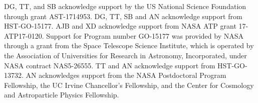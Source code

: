 DG, TT, and SB acknowledge support by the US National Science Foundation through grant AST-1714953. DG, TT, SB and AN acknowledge support from HST-GO-15177. AJB and XD acknowledge support from NASA ATP grant 17-ATP17-0120. Support for Program number GO-15177 was provided by NASA through a grant from the Space Telescope Science Institute, which is operated by the Association of Universities for Research in Astronomy, Incorporated, under NASA contract NAS5-26555. TT and AN acknowledge support from HST-GO-13732. AN acknowledges support from the NASA Postdoctoral Program Fellowship, the UC Irvine Chancellor's Fellowship, and the Center for Cosmology and Astroparticle Physics Fellowship. 


